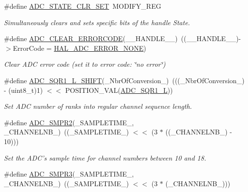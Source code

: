 \begin{DoxyCompactItemize}
\#define \hyperlink{group___a_d_c___private___macros_gaaf93e91b164d4a220aae475eff82665f}{A\-D\-C\-\_\-\-S\-T\-A\-T\-E\-\_\-\-C\-L\-R\-\_\-\-S\-E\-T}~M\-O\-D\-I\-F\-Y\-\_\-\-R\-E\-G
\begin{DoxyCompactList}\small\item\em Simultaneously clears and sets specific bits of the handle State. \end{DoxyCompactList}\item 
\#define \hyperlink{group___a_d_c___private___macros_gac7ab87a3ab932eed1b3ac5faad4e3aa9}{A\-D\-C\-\_\-\-C\-L\-E\-A\-R\-\_\-\-E\-R\-R\-O\-R\-C\-O\-D\-E}(\-\_\-\-\_\-\-H\-A\-N\-D\-L\-E\-\_\-\-\_\-)~((\-\_\-\-\_\-\-H\-A\-N\-D\-L\-E\-\_\-\-\_\-)-\/$>$Error\-Code = \hyperlink{group___a_d_c___error___code_ga93b4576d46ee0f8c53b7d69f39778e38}{H\-A\-L\-\_\-\-A\-D\-C\-\_\-\-E\-R\-R\-O\-R\-\_\-\-N\-O\-N\-E})
\begin{DoxyCompactList}\small\item\em Clear A\-D\-C error code (set it to error code\-: \char`\"{}no error\char`\"{}) \end{DoxyCompactList}\item 
\#define \hyperlink{group___a_d_c___private___macros_ga2b29c0e46fa4205f77b15fe7c3425fb8}{A\-D\-C\-\_\-\-S\-Q\-R1\-\_\-\-L\-\_\-\-S\-H\-I\-F\-T}(\-\_\-\-Nbr\-Of\-Conversion\-\_\-)~(((\-\_\-\-Nbr\-Of\-Conversion\-\_\-) -\/ (uint8\-\_\-t)1) $<$$<$ P\-O\-S\-I\-T\-I\-O\-N\-\_\-\-V\-A\-L(\hyperlink{group___peripheral___registers___bits___definition_gae68a19a18d72f6d87c6f2b8cc8bfc6dc}{A\-D\-C\-\_\-\-S\-Q\-R1\-\_\-\-L}))
\begin{DoxyCompactList}\small\item\em Set A\-D\-C number of ranks into regular channel sequence length. \end{DoxyCompactList}\item 
\#define \hyperlink{group___a_d_c___private___macros_gaeb66714538d978d4d336a4a6ef0d58bc}{A\-D\-C\-\_\-\-S\-M\-P\-R2}(\-\_\-\-S\-A\-M\-P\-L\-E\-T\-I\-M\-E\-\_\-, \-\_\-\-C\-H\-A\-N\-N\-E\-L\-N\-B\-\_\-)~((\-\_\-\-S\-A\-M\-P\-L\-E\-T\-I\-M\-E\-\_\-) $<$$<$ (3 $\ast$ ((\-\_\-\-C\-H\-A\-N\-N\-E\-L\-N\-B\-\_\-) -\/ 10)))
\begin{DoxyCompactList}\small\item\em Set the A\-D\-C's sample time for channel numbers between 10 and 18. \end{DoxyCompactList}\item 
\#define \hyperlink{group___a_d_c___private___macros_gaa019110bc5a725ea0cba5820a01c265f}{A\-D\-C\-\_\-\-S\-M\-P\-R3}(\-\_\-\-S\-A\-M\-P\-L\-E\-T\-I\-M\-E\-\_\-, \-\_\-\-C\-H\-A\-N\-N\-E\-L\-N\-B\-\_\-)~((\-\_\-\-S\-A\-M\-P\-L\-E\-T\-I\-M\-E\-\_\-) $<$$<$ (3 $\ast$ (\-\_\-\-C\-H\-A\-N\-N\-E\-L\-N\-B\-\_\-)))
$$
\end{DoxyCompactItemize}
